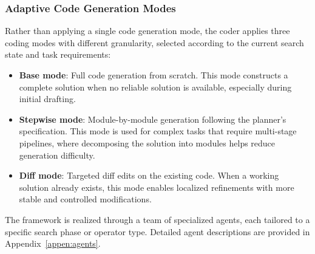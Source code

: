 \subsubsection{Adaptive Code Generation Modes}

Rather than applying a single code generation mode, the coder applies three coding modes with different granularity, selected according to the current search state and task requirements:

\begin{itemize}[leftmargin=*]
    \item \textbf{Base mode}: Full code generation from scratch. This mode constructs a complete solution when no reliable solution is available, especially during initial drafting.

    \item \textbf{Stepwise mode}: Module-by-module generation following the planner's specification. This mode is used for complex tasks that require multi-stage pipelines, where decomposing the solution into modules helps reduce generation difficulty.

    \item \textbf{Diff mode}: Targeted diff edits on the existing code. When a working solution already exists, this mode enables localized refinements with more stable and controlled modifications.
\end{itemize}

The framework is realized through a team of specialized agents, each tailored to a specific search phase or operator type. Detailed agent descriptions are provided in Appendix~\ref{appen:agents}.